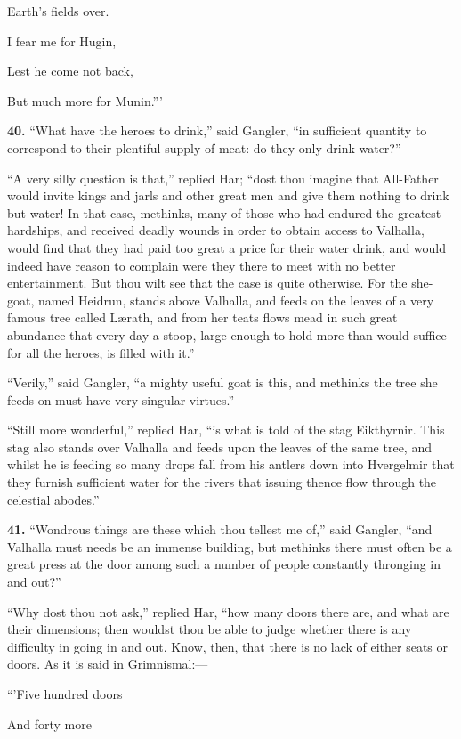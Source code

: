 Earth's fields over.

I fear me for Hugin,

Lest he come not back,

But much more for Munin.'''

\textbf{40.} ``What have the heroes to drink,'' said Gangler, ``in sufficient
quantity to correspond to their plentiful supply of meat: do they only
drink water?''

``A very silly question is that,'' replied Har; ``dost thou imagine that
All-Father would invite kings and jarls and other great men and give
them nothing to drink but water! In that case, methinks, many of those
who had endured the greatest hardships, and received deadly wounds in
order to obtain access to Valhalla, would find that they had paid too
great a price for their water drink, and would indeed have reason to
complain were they there to meet with no better entertainment. But
thou wilt see that the case is quite otherwise. For the she-goat,
named Heidrun, stands above Valhalla, and feeds on the leaves of a
very famous tree called Lærath, and from her teats flows mead in such
great abundance that every day a stoop, large enough to hold more than
would suffice for all the heroes, is filled with it.''

``Verily,'' said Gangler, ``a mighty useful goat is this, and methinks
the tree she feeds on must have very singular virtues.''

``Still more wonderful,'' replied Har, ``is what is told of the stag
Eikthyrnir. This stag also stands over Valhalla and feeds upon the
leaves of the same tree, and whilst he is feeding so many drops fall
from his antlers down into Hvergelmir that they furnish sufficient
water for the rivers that issuing thence flow through the celestial
abodes.''

\textbf{41.} ``Wondrous things are these which thou tellest me of,'' said
Gangler, ``and Valhalla must needs be an immense building, but methinks
there must often be a great press at the door among such a number of
people constantly thronging in and out?''

``Why dost thou not ask,'' replied Har, ``how many doors there are, and
what are their dimensions; then wouldst thou be able to judge whether
there is any difficulty in going in and out. Know, then, that there is
no lack of either seats or doors. As it is said in Grimnismal:—

``'Five hundred doors

And forty more


